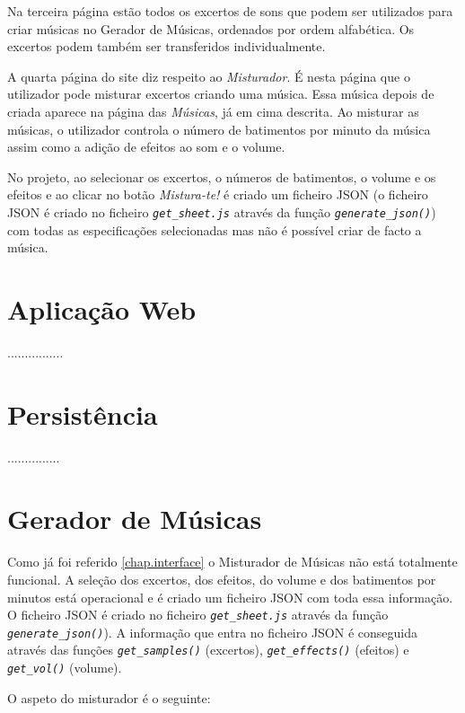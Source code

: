 \documentclass{report}
\begin{document}
Na terceira página estão todos os excertos de sons que podem ser utilizados para criar músicas no Gerador de Músicas, ordenados por ordem alfabética. Os excertos podem também ser transferidos individualmente.

A quarta página do site diz respeito ao \textit{Misturador}. É nesta página que o utilizador pode misturar excertos criando uma música. Essa música depois de criada aparece na página das \textit{Músicas}, já em cima descrita. 
Ao misturar as músicas, o utilizador controla o número de batimentos por minuto da música assim como a adição de efeitos ao som e o volume.

No projeto, ao selecionar os excertos, o números de batimentos, o volume e os efeitos e ao clicar no botão \textit{Mistura-te!} é criado um ficheiro JSON (o ficheiro JSON é criado no ficheiro \textit{\texttt{get\_sheet.js}} através da função \textit{\texttt{generate\_json()}}) com todas as especificações selecionadas mas não é possível criar de facto a música. 


\section{Aplicação Web}
\label{chap.aplicacao}
................

\section{Persistência}
\label{chap.persistencia}
...............

\section{Gerador de Músicas}
\label{chap.gerador}
Como já foi referido \autoref{chap.interface} o Misturador de Músicas não está totalmente funcional. A seleção dos excertos, dos efeitos, do volume e dos batimentos por minutos está operacional e é criado um ficheiro JSON com toda essa informação. O ficheiro JSON é criado no ficheiro \textit{\texttt{get\_sheet.js}} através da função \textit{\texttt{generate\_json()}}). A informação que entra no ficheiro JSON é conseguida através das funções \textit{\texttt{get\_samples()}} (excertos), \textit{\texttt{get\_effects()}} (efeitos) e \textit{\texttt{get\_vol()}} (volume).

O aspeto do misturador é o seguinte:
\end{document}
